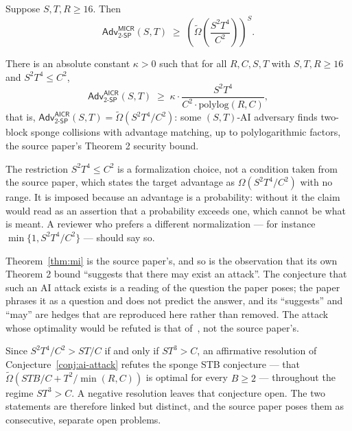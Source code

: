 \documentclass{aicr-conjecture}
\newcommand{\SP}{\mathsf{SP}}
\newcommand{\Adv}{\mathsf{Adv}}
\newcommand{\AICR}{\mathsf{AICR}}
\newcommand{\MICR}{\mathsf{MICR}}
\newcommand{\tOm}{\tilde{\Omega}}
\begin{document}
\begin{theorem}\label{thm:mi}
Suppose $S, T, R \ge 16$. Then
\[
  \Adv^{\MICR}_{2\text{-}\SP}(S,T)
  \;\ge\; \left(\tOm\!\left(\frac{S^{2}T^{4}}{C^{2}}\right)\right)^{S}.
\]
\end{theorem}

\begin{conjecture}\label{conj:ai-attack}
There is an absolute constant $\kappa > 0$ such that for all
$R, C, S, T$ with $S, T, R \ge 16$ and $S^{2}T^{4} \le C^{2}$,
\[
  \Adv^{\AICR}_{2\text{-}\SP}(S,T)
  \;\ge\; \kappa \cdot \frac{S^{2}T^{4}}{C^{2}
          \cdot \mathrm{polylog}(R,C)} ,
\]
that is, $\Adv^{\AICR}_{2\text{-}\SP}(S,T) =
\tOm(S^{2}T^{4}/C^{2})$: some $(S,T)$-AI adversary finds two-block
sponge collisions with advantage matching, up to polylogarithmic
factors, the source paper's Theorem 2 security bound.
\end{conjecture}

\begin{remark}\label{rem:sidecondition}
The restriction $S^{2}T^{4} \le C^{2}$ is a formalization choice, not a
condition taken from the source paper, which states the target
advantage as $\Omega(S^{2}T^{4}/C^{2})$ with no range. It is imposed
because an advantage is a probability: without it the claim would read
as an assertion that a probability exceeds one, which cannot be what is
meant. A reviewer who prefers a different normalization --- for
instance $\min\{1, S^{2}T^{4}/C^{2}\}$ --- should say so.
\end{remark}

\begin{remark}\label{rem:attribution}
Theorem~\ref{thm:mi} is the source paper's, and so is the observation
that its own Theorem 2 bound ``suggests that there may exist an
attack''. The conjecture that such an AI attack exists is a reading of
the question the paper poses; the paper phrases it as a question and
does not predict the answer, and its ``suggests'' and ``may'' are
hedges that are reproduced here rather than removed. The attack whose
optimality would be refuted is that of~\cite{FGK22}, not the source
paper's.
\end{remark}

\begin{remark}\label{rem:stb}
Since $S^{2}T^{4}/C^{2} > ST/C$ if and only if $ST^{3} > C$, an
affirmative resolution of Conjecture~\ref{conj:ai-attack} refutes the
sponge STB conjecture --- that $\tOm(STB/C + T^{2}/\min(R,C))$ is
optimal for every $B \ge 2$ --- throughout the regime $ST^{3} > C$. A
negative resolution leaves that conjecture open. The two statements
are therefore linked but distinct, and the source paper poses them as
consecutive, separate open problems.
\end{remark}
\end{document}
